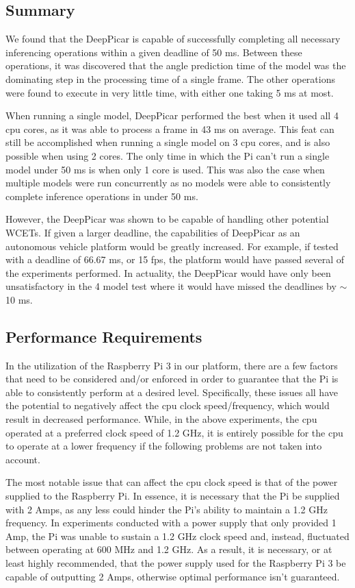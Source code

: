 \subsection{Summary}
We found that the DeepPicar is capable of successfully completing all necessary inferencing 
operations within a given deadline of 50 ms. Between these operations, it was discovered that the 
angle prediction time of the model was the dominating step in the processing time of a single frame. 
The other operations were found to execute in very little time, with either one taking 5 ms at most.

When running a single model, DeepPicar performed the best when it used all 4 cpu cores, as it was 
able to process a frame in 43 ms on average. This feat can still be accomplished when running a 
single model on 3 cpu cores, and is also possible when using 2 cores. The only time in which the Pi 
can't run a single model under 50 ms is when only 1 core is used. This was also the case when 
multiple models were run concurrently as no models were able to consistently complete inference 
operations in under 50 ms.

However, the DeepPicar was shown to be capable of handling other potential WCETs. If given a larger 
deadline, the capabilities of DeepPicar as an autonomous vehicle platform would be greatly increased. 
For example, if tested with a deadline of 66.67 ms, or 15 fps, the platform would have passed several 
of the experiments performed. In actuality, the DeepPicar would have only been unsatisfactory in the 
4 model test where it would have missed the deadlines by $\sim$10 ms.

\subsection{Performance Requirements}
In the utilization of the Raspberry Pi 3 in our platform, there are a few factors that need to be 
considered and/or enforced in order to guarantee that the Pi is able to consistently perform at a 
desired level. Specifically, these issues all have the potential to negatively affect the cpu clock 
speed/frequency, which would result in decreased performance. While, in the above experiments, the cpu 
operated at a preferred clock speed of 1.2 GHz, it is entirely possible for the cpu to operate at a 
lower frequency if the following problems are not taken into account.

The most notable issue that can affect the cpu clock speed is that of the power supplied to the 
Raspberry Pi. In essence, it is necessary that the Pi be supplied with 2 Amps, as any less could 
hinder the Pi's ability to maintain a 1.2 GHz frequency. In experiments conducted with a power supply that 
only provided 1 Amp, the Pi was unable to sustain a 1.2 GHz clock speed and, instead, fluctuated 
between operating at 600 MHz and 1.2 GHz. As a result, it is necessary, or at least highly 
recommended, that the power supply used for the Raspberry Pi 3 be capable of outputting 2 Amps, 
otherwise optimal performance isn't guaranteed.

